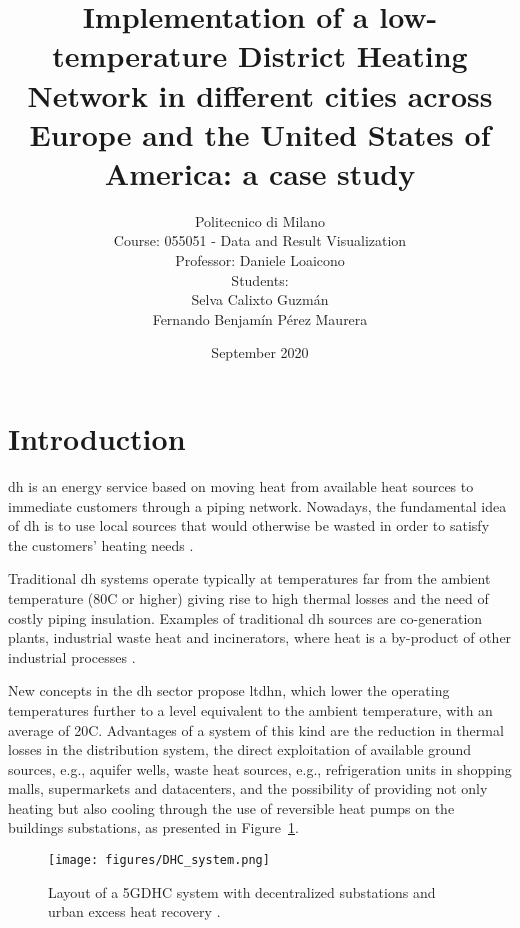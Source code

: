 \documentclass{article}
\author{
    {Politecnico di Milano}\\
    {Course: 055051 - Data and Result Visualization} \\
    {Professor: Daniele Loaicono} \\
    {Students:} \\
    {Selva Calixto Guzmán} \\
    {Fernando Benjamín Pérez Maurera}
}
\title{Implementation of a low-temperature District Heating Network in different cities across Europe and the United States of America: a case study}
\date{September 2020}
\begin{document}
\newcommand{\idest}{i.e.,\xspace}
\newcommand{\eg}{e.g.,\xspace}
\newcommand{\inspire}{iNSPiRe\xspace}
\newcommand{\fernando}[1]{\textcolor{orange}{\textbf{[Fernando] #1}}}
\newcommand{\selva}[1]{\textcolor{blue}{\textbf{[Selva] #1}}}

\maketitle


\section{Introduction}
\label{sec:introduction}

\gls{dh} is an energy service based on moving heat from available heat sources to immediate customers through a piping network. Nowadays, the fundamental idea of \gls{dh} is to use local sources that would otherwise be wasted in order to satisfy the customers' heating needs \cite{werner_district_2013}.

Traditional \gls{dh} systems operate typically at temperatures far from the ambient temperature (80\degree C or higher) giving rise to high thermal losses and the need of costly piping insulation. Examples of traditional \gls{dh} sources are co-generation plants, industrial waste heat and incinerators, where heat is a by-product of other industrial processes \cite{noauthor_home_nodate}.

New concepts in the \gls{dh} sector propose \gls{ltdhn}, which lower the operating temperatures further to a level equivalent to the ambient temperature, with an average of 20\degree C. Advantages of a system of this kind are the reduction in thermal losses in the distribution system, the direct exploitation of available ground sources, \eg aquifer wells, waste heat sources, \eg refrigeration units in shopping malls, supermarkets and datacenters, and the possibility of providing not only heating but also cooling through the use of reversible heat pumps on the buildings substations, as presented in Figure~\ref{fig:DHC_system}.

\begin{figure}[ht]
\centering
\texttt{[image: figures/DHC\_system.png]}
\caption{Layout of a 5GDHC system with decentralized substations and urban excess heat recovery \cite{buffa_fifth-generation_2020}. }
\label{fig:DHC_system}
\end{figure}
\end{document}
